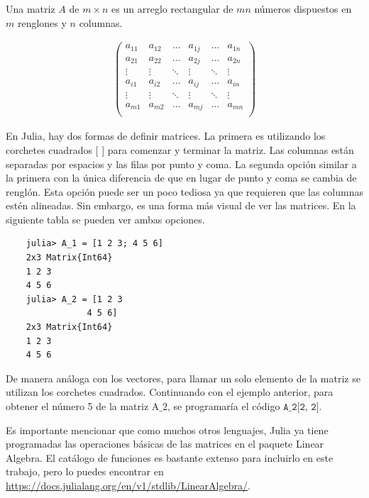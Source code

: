 \begin{definition}
Una matriz $A$ de $m \times n$ es un arreglo rectangular de $mn$ números dispuestos en $m$ renglones y $n$ columnas. 

\begin{equation*}
    \begin{aligned}
    \begin{pmatrix}
    a_{11} & a_{12} & \dots & a_{1j} & \dots & a_{1n} \\
    a_{21} & a_{22} & \dots & a_{2j} & \dots & a_{2n} \\
    \vdots &  \vdots  &  \ddots &  \vdots  & \ddots &\vdots\\
    a_{i1} & a_{i2} & \dots & a_{ij} & \dots & a_{in} \\
    \vdots &  \vdots  &  \ddots &  \vdots  & \ddots &\vdots\\
     a_{m1} & a_{m2} & \dots & a_{mj} & \dots & a_{mn} \\
    \end{pmatrix} 
    \end{aligned}
\end{equation*}
\end{definition}


En Julia, hay dos formas de definir matrices. La primera es utilizando los corchetes cuadrados $[$ $]$ para comenzar y terminar la matriz. Las columnas están separadas por espacios y las filas por punto y coma. La segunda opción similar a la primera con la única diferencia de que en lugar de punto y coma se cambia de renglón. Esta opción puede ser un poco tediosa ya que requieren que las columnas estén alineadas. Sin embargo, es una forma más visual de ver las matrices. En la siguiente tabla se pueden ver ambas opciones. 

\begin{verbatim}
	julia> A_1 = [1 2 3; 4 5 6]
	2x3 Matrix{Int64}
	1 2 3
	4 5 6
	julia> A_2 = [1 2 3
				4 5 6]
	2x3 Matrix{Int64}
	1 2 3
	4 5 6

\end{verbatim}

De manera análoga con los vectores, para llamar un solo elemento de la matriz se utilizan los corchetes cuadrados. Continuando con el ejemplo anterior, para obtener el número 5 de la matriz $\text{A\_2}$, se programaría el código $\texttt{A\_2[2, 2]}$.

Es importante mencionar que como muchos otros lenguajes, Julia ya tiene programadas las operaciones básicas de las matrices en el paquete \textsf{Linear Algebra}. El catálogo de funciones es bastante extenso para incluirlo en este trabajo, pero lo puedes encontrar en \url{https://docs.julialang.org/en/v1/stdlib/LinearAlgebra/}.

